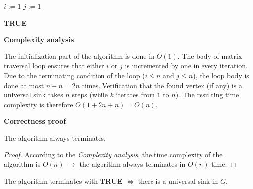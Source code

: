 \begin{algorithm}[H]

  $i := 1$\;
  $j := 1$\;


   {
    \Return \textbf{TRUE}\;
  }
\end{algorithm}

\textbf{Complexity analysis}

The initialization part of the algorithm is done in $O(1)$. The body of matrix
traversal loop ensures that either $i$ or $j$ is incremented by one in every
iteration. Due to the terminating condition of the loop ($i \le n$ and $j \le
n$), the loop body is done at most $n + n = 2n$ times. Verification that the
found vertex (if any) is a universal sink takes $n$ steps (while $k$ iterates
from $1$ to $n$). The resulting time complexity is therefore $O(1 + 2n + n)
= O(n)$.

\textbf{Correctness proof}


\begin{theorem}
The algorithm always terminates.
\end{theorem}

\begin{proof}
According to the \textit{Complexity analysis}, the time complexity of the
algorithm is $O(n)$ $\to$ the algorithm always terminates in $O(n)$ time.
\end{proof}

\pagebreak
\begin{theorem}\label{theorem_correct}
The algorithm terminates with \textbf{TRUE} $\Leftrightarrow$ there is
a universal sink in $G$.
\end{theorem}

